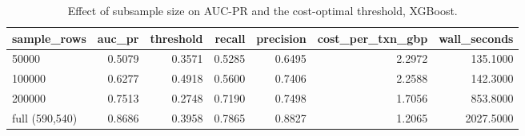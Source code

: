 \begin{table}
\caption{Effect of subsample size on AUC-PR and the cost-optimal threshold, XGBoost.}
\label{tab:table8_sample_size_ablation}
\begin{tabular}{lrrrrrr}
\toprule
sample\_rows & auc\_pr & threshold & recall & precision & cost\_per\_txn\_gbp & wall\_seconds \\
\midrule
50000 & 0.5079 & 0.3571 & 0.5285 & 0.6495 & 2.2972 & 135.1000 \\
100000 & 0.6277 & 0.4918 & 0.5600 & 0.7406 & 2.2588 & 142.3000 \\
200000 & 0.7513 & 0.2748 & 0.7190 & 0.7498 & 1.7056 & 853.8000 \\
full (590,540) & 0.8686 & 0.3958 & 0.7865 & 0.8827 & 1.2065 & 2027.5000 \\
\bottomrule
\end{tabular}
\end{table}
